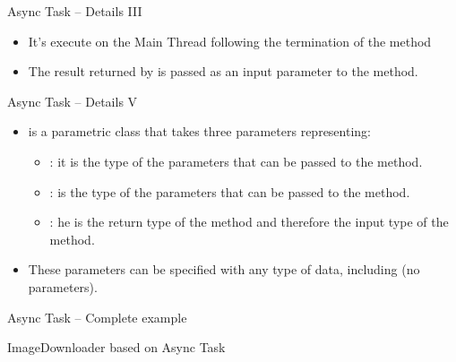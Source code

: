 \documentclass{beamer}
\begin{document}
  \begin{frame}{Async Task -- Details III}
    \begin{block}{}
      \begin{itemize}
        \item It's execute on the Main Thread following the termination of the
         method
        \item The result returned by  is passed as an
        input parameter to the method. 
      \end{itemize}
    \end{block}
  \end{frame}
 
  \begin{frame}{Async Task -- Details V}
    \begin{block}{}
      \begin{itemize}
        \item {} is a parametric class
        that takes three parameters representing:
        \begin{itemize}
          \item {}: it is the type of the parameters that can be
          passed to the  method.
          \item {}: is the type of the parameters that can be passed
          to the  method. 
          \item {}: he is the return type of the 
          method and therefore the input type of the  method.
        \end{itemize}
        \item These parameters can be specified with any type of data, including
         (no parameters).
      \end{itemize}
    \end{block}
  \end{frame}

  \begin{frame}{Async Task -- Complete example}
    \begin{exampleblock}{ImageDownloader based on Async Task}
      
    \end{exampleblock}
    \begin{exampleblock}{}
      
    \end{exampleblock}
  \end{frame}
\end{document}
